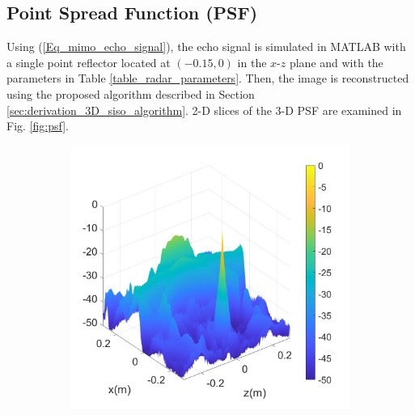 \documentclass[conference]{IEEEtran}
\begin{document}
		\subsection{Point Spread Function (PSF)}
			
		Using (\ref{Eq_mimo_echo_signal}), the echo signal is simulated in MATLAB with a single point reflector located at $(-0.15,0)$ in the $x\text{-}z$ plane and with the parameters in Table \ref{table_radar_parameters}. Then, the image is reconstructed using the proposed algorithm described in Section \ref{sec:derivation_3D_siso_algorithm}. 2-D slices of the 3-D PSF are examined in Fig. \ref{fig:psf}.
		\begin{figure} [h]
			\begin{subfigure}{.5\linewidth}
				\centering
				\includegraphics[width=1\linewidth]{../MatlabResults/CSAR_PSFxz_R0_250_DS_478}
				\caption{}
				\label{fig:psf_xz_R0_250_DS_478}
			\end{subfigure}%
			\begin{subfigure}{.5\linewidth}
				\label{fig:psf_xy_R0_250_DS_478}
				\centering

\end{subfigure}
\end{figure}
\end{document}
